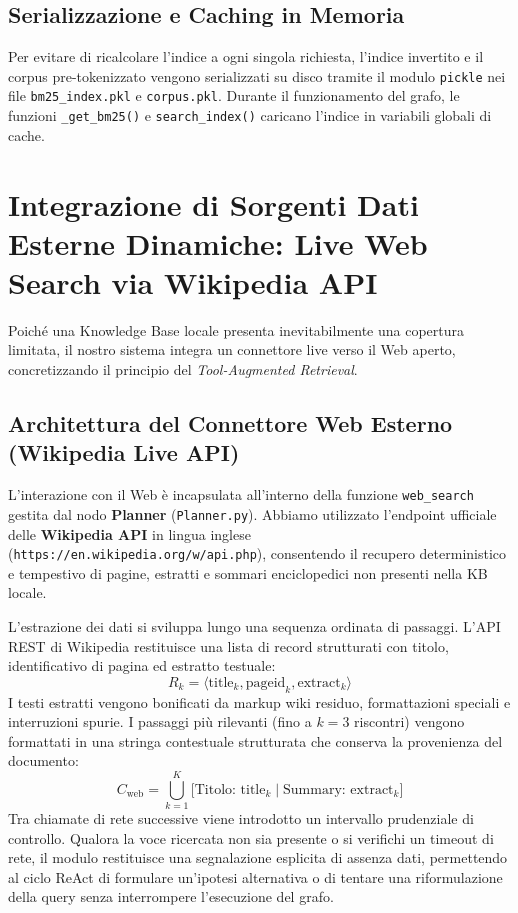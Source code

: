 \subsection{Serializzazione e Caching in Memoria}
Per evitare di ricalcolare l'indice a ogni singola richiesta, l'indice invertito e il corpus pre-tokenizzato vengono serializzati su disco tramite il modulo \texttt{pickle} nei file \texttt{bm25\_index.pkl} e \texttt{corpus.pkl}. Durante il funzionamento del grafo, le funzioni \texttt{\_get\_bm25()} e \texttt{search\_index()} caricano l'indice in variabili globali di cache.

\section{Integrazione di Sorgenti Dati Esterne Dinamiche: Live Web Search via Wikipedia API}
\label{sec:web_search}

Poiché una Knowledge Base locale presenta inevitabilmente una copertura limitata, il nostro sistema integra un connettore live verso il Web aperto, concretizzando il principio del \textit{Tool-Augmented Retrieval}.

\subsection{Architettura del Connettore Web Esterno (Wikipedia Live API)}
L'interazione con il Web è incapsulata all'interno della funzione \texttt{web\_search} gestita dal nodo \textbf{Planner} (\texttt{Planner.py}). Abbiamo utilizzato l'endpoint ufficiale delle \textbf{Wikipedia API} in lingua inglese (\texttt{https://en.wikipedia.org/w/api.php}), consentendo il recupero deterministico e tempestivo di pagine, estratti e sommari enciclopedici non presenti nella KB locale.

L'estrazione dei dati si sviluppa lungo una sequenza ordinata di passaggi. L'API REST di Wikipedia restituisce una lista di record strutturati con titolo, identificativo di pagina ed estratto testuale:
\begin{equation}
R_k = \langle \text{title}_k, \text{pageid}_k, \text{extract}_k \rangle
\end{equation}
I testi estratti vengono bonificati da markup wiki residuo, formattazioni speciali e interruzioni spurie. I passaggi più rilevanti (fino a $k=3$ riscontri) vengono formattati in una stringa contestuale strutturata che conserva la provenienza del documento:
\begin{equation}
C_{\text{web}} = \bigcup_{k=1}^K \big[ \text{Titolo: } \text{title}_k \mid \text{Summary: } \text{extract}_k \big]
\end{equation}
Tra chiamate di rete successive viene introdotto un intervallo prudenziale di controllo. Qualora la voce ricercata non sia presente o si verifichi un timeout di rete, il modulo restituisce una segnalazione esplicita di assenza dati, permettendo al ciclo ReAct di formulare un'ipotesi alternativa o di tentare una riformulazione della query senza interrompere l'esecuzione del grafo.


